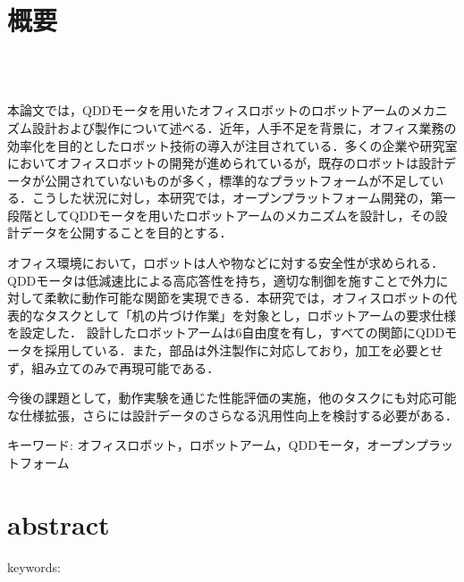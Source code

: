\chapter*{概要}
\thispagestyle{empty}
%
\begin{center}
  \scalebox{1.5}{オープンプラットフォームオフィスロボットの開発}\\
  \scalebox{1.2}{-QDDモータを使用したロボットアームの設計と製作-}\\
\end{center}
\vspace{1.0zh}
%

本論文では，QDDモータを用いたオフィスロボットのロボットアームのメカニズム設計および製作について述べる．近年，人手不足を背景に，オフィス業務の効率化を目的としたロボット技術の導入が注目されている．多くの企業や研究室においてオフィスロボットの開発が進められているが，既存のロボットは設計データが公開されていないものが多く，標準的なプラットフォームが不足している．こうした状況に対し，本研究では，オープンプラットフォーム開発の，第一段階としてQDDモータを用いたロボットアームのメカニズムを設計し，その設計データを公開することを目的とする．

オフィス環境において，ロボットは人や物などに対する安全性が求められる．QDDモータは低減速比による高応答性を持ち，適切な制御を施すことで外力に対して柔軟に動作可能な関節を実現できる．本研究では，オフィスロボットの代表的なタスクとして「机の片づけ作業」を対象とし，ロボットアームの要求仕様を設定した．
設計したロボットアームは6自由度を有し，すべての関節にQDDモータを採用している．また，部品は外注製作に対応しており，加工を必要とせず，組み立てのみで再現可能である．

今後の課題として，動作実験を通じた性能評価の実施，他のタスクにも対応可能な仕様拡張，さらには設計データのさらなる汎用性向上を検討する必要がある．


キーワード: オフィスロボット，ロボットアーム，QDDモータ，オープンプラットフォーム
%
\newpage
\chapter*{abstract}
\thispagestyle{empty}
%
\begin{center}
  \scalebox{1.3}{title}
\end{center}
\vspace{1.0zh}
%


keywords: 
